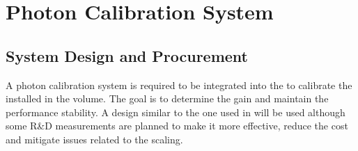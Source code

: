 \section{Photon Calibration System}
\label{sec:fddp-pd-5}

\subsection{System Design and Procurement}
\label{sec:fddp-pd-5.1}

A photon calibration system is required to be integrated into the  to calibrate the  
installed in the \lar volume. The goal is to determine the  gain and maintain the  performance stability. A design similar to the one used in  will be used although some R\&D measurements are planned to make it more effective, reduce the cost and mitigate issues related to the scaling.

